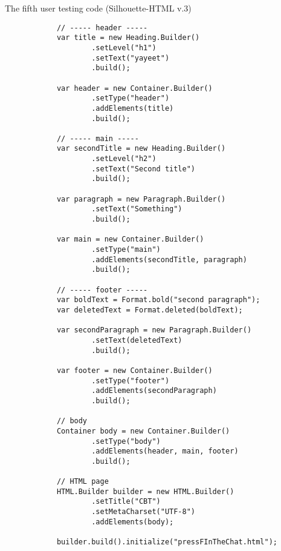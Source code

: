 \documentclass[12pt]{article}
\begin{document}
        \begin{shaded}
            The fifth user testing code (Silhouette-HTML v.3)
            \begin{lstlisting}
            // ----- header -----
            var title = new Heading.Builder()
                    .setLevel("h1")
                    .setText("yayeet")
                    .build();

            var header = new Container.Builder()
                    .setType("header")
                    .addElements(title)
                    .build();

            // ----- main -----
            var secondTitle = new Heading.Builder()
                    .setLevel("h2")
                    .setText("Second title")
                    .build();

            var paragraph = new Paragraph.Builder()
                    .setText("Something")
                    .build();

            var main = new Container.Builder()
                    .setType("main")
                    .addElements(secondTitle, paragraph)
                    .build();

            // ----- footer -----
            var boldText = Format.bold("second paragraph");
            var deletedText = Format.deleted(boldText);

            var secondParagraph = new Paragraph.Builder()
                    .setText(deletedText)
                    .build();

            var footer = new Container.Builder()
                    .setType("footer")
                    .addElements(secondParagraph)
                    .build();

            // body
            Container body = new Container.Builder()
                    .setType("body")
                    .addElements(header, main, footer)
                    .build();

            // HTML page
            HTML.Builder builder = new HTML.Builder()
                    .setTitle("CBT")
                    .setMetaCharset("UTF-8")
                    .addElements(body);

            builder.build().initialize("pressFInTheChat.html");
            \end{lstlisting}
        \end{shaded}
\end{document}
